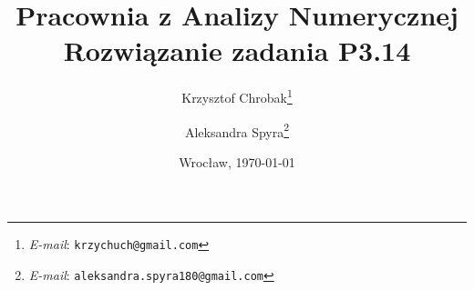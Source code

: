 \documentclass[12pt,a4paper,wide,authortitle]{mwart}
\numberwithin{figure}{section}
\numberwithin{table}{section}
\begin{document}
\title{\LARGE \textbf{Pracownia z Analizy Numerycznej}\\Rozwiązanie zadania P3.14}
\author{Krzysztof Chrobak\thanks{\textit{E-mail}:
\texttt{krzychuch@gmail.com}} \and Aleksandra Spyra\thanks{\textit{E-mail}:
\texttt{aleksandra.spyra180@gmail.com}}}
\date {Wrocław, \today}
\maketitle
\tableofcontents
\newpage







\end{document}
